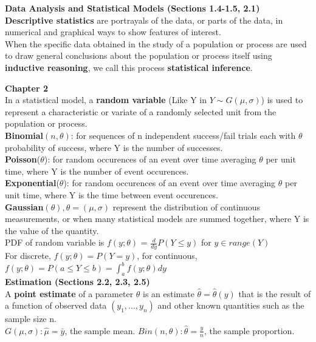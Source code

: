 \documentclass[a4paper,12pt]{article}
\begin{document}
\textbf{Data Analysis and Statistical Models (Sections 1.4-1.5, 2.1)}
\bigskip
\\\textbf{Descriptive statistics} are portrayals of the data, or parts of the
data, in numerical and graphical ways to show features of interest.
\\When the specific data obtained in the study of a population or process are
used to draw general conclusions about the population or process
itself using \textbf{inductive reasoning}, we call this process \textbf{statistical inference}.


\newpage
\textbf{Chapter 2}  
\\

In a statistical model, a \textbf{random variable} (Like Y in $Y\sim G(\mu,\sigma)$) is used to represent a
characteristic or variate of a randomly selected unit from the
population or process.
\\

\textbf{Binomial}$(n, \theta)$: 
for sequences of n independent success/fail trials each with $\theta$
probability of success, where 
Y is the number of successes.
\\\textbf{Poisson}($\theta$): for random occurences of an event over time averaging $\theta$ per unit time, where Y is the number of event occurences.
\\\textbf{Exponential}($\theta$): for random occurences of an event over time averaging $\theta$ per unit time, where Y is the time between event occurences.
\\\textbf{Gaussian}$(\theta), \theta = (\mu,\sigma)$ represent the
distribution of continuous measurements, or when many statistical models are summed together, where Y is the value of the quantity.
\\

PDF of random variable is $f(y;\theta)$ = $\frac{d}{dy}P(Y \leq y) $ for $ y \in range(Y)$
\\ For discrete, $f(y ; \theta) = P(Y = y)$, for continuous, $f(y ; \theta) = P(a \leq Y \leq b) =  \int_{a}^{b}f(y ; \theta)dy$
\\

\textbf{Estimation (Sections 2.2, 2.3, 2.5)}
\\

A \textbf{point estimate} of a parameter 
$\theta$ is an estimate $\hat{\theta} = \hat{\theta}(y)$
that is the result of a function of observed data $(y_1, ..., y_n)$ and other known quantities such as the
sample size n.
\\$G(\mu,\sigma): \hat{\mu} = \bar{y}$, the sample mean. $Bin(n, \theta): \hat{\theta} = \frac{y}{n}$, the sample proportion.
\\
\end{document}
